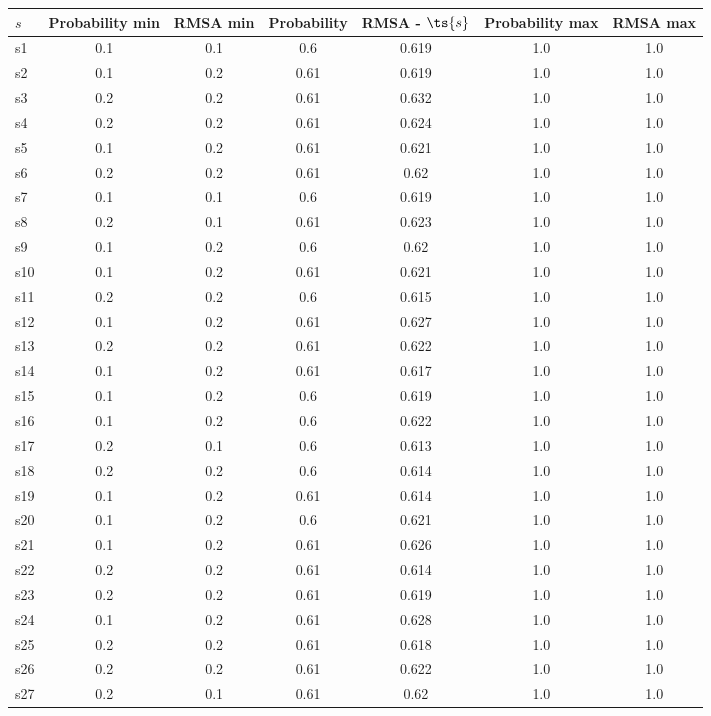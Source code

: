 \documentclass{article}
\begin{document}
\noindent\begin{tabular}{|l|c|c|c|c|c|c|}
\hline
$s$& Probability min & RMSA min & Probability & RMSA - $\ts{s}$ & Probability max & RMSA max\\
\hline
s1 &0.1 & 0.1 & 0.6 & 0.619 & 1.0 & 1.0\\
\hline
s2 &0.1 & 0.2 & 0.61 & 0.619 & 1.0 & 1.0\\
\hline
s3 &0.2 & 0.2 & 0.61 & 0.632 & 1.0 & 1.0\\
\hline
s4 &0.2 & 0.2 & 0.61 & 0.624 & 1.0 & 1.0\\
\hline
s5 &0.1 & 0.2 & 0.61 & 0.621 & 1.0 & 1.0\\
\hline
s6 &0.2 & 0.2 & 0.61 & 0.62 & 1.0 & 1.0\\
\hline
s7 &0.1 & 0.1 & 0.6 & 0.619 & 1.0 & 1.0\\
\hline
s8 &0.2 & 0.1 & 0.61 & 0.623 & 1.0 & 1.0\\
\hline
s9 &0.1 & 0.2 & 0.6 & 0.62 & 1.0 & 1.0\\
\hline
s10 &0.1 & 0.2 & 0.61 & 0.621 & 1.0 & 1.0\\
\hline
s11 &0.2 & 0.2 & 0.6 & 0.615 & 1.0 & 1.0\\
\hline
s12 &0.1 & 0.2 & 0.61 & 0.627 & 1.0 & 1.0\\
\hline
s13 &0.2 & 0.2 & 0.61 & 0.622 & 1.0 & 1.0\\
\hline
s14 &0.1 & 0.2 & 0.61 & 0.617 & 1.0 & 1.0\\
\hline
s15 &0.1 & 0.2 & 0.6 & 0.619 & 1.0 & 1.0\\
\hline
s16 &0.1 & 0.2 & 0.6 & 0.622 & 1.0 & 1.0\\
\hline
s17 &0.2 & 0.1 & 0.6 & 0.613 & 1.0 & 1.0\\
\hline
s18 &0.2 & 0.2 & 0.6 & 0.614 & 1.0 & 1.0\\
\hline
s19 &0.1 & 0.2 & 0.61 & 0.614 & 1.0 & 1.0\\
\hline
s20 &0.1 & 0.2 & 0.6 & 0.621 & 1.0 & 1.0\\
\hline
s21 &0.1 & 0.2 & 0.61 & 0.626 & 1.0 & 1.0\\
\hline
s22 &0.2 & 0.2 & 0.61 & 0.614 & 1.0 & 1.0\\
\hline
s23 &0.2 & 0.2 & 0.61 & 0.619 & 1.0 & 1.0\\
\hline
s24 &0.1 & 0.2 & 0.61 & 0.628 & 1.0 & 1.0\\
\hline
s25 &0.2 & 0.2 & 0.61 & 0.618 & 1.0 & 1.0\\
\hline
s26 &0.2 & 0.2 & 0.61 & 0.622 & 1.0 & 1.0\\
\hline
s27 &0.2 & 0.1 & 0.61 & 0.62 & 1.0 & 1.0\\

\end{tabular}
\end{document}
